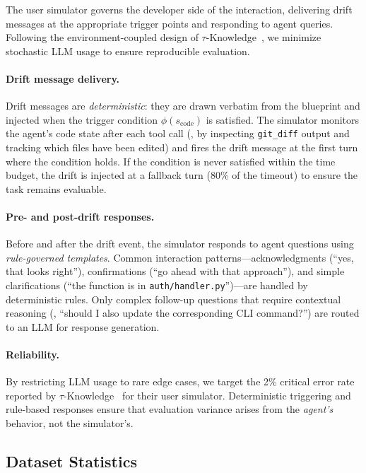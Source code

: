 The user simulator governs the developer side of the interaction, delivering drift messages at the appropriate trigger points and responding to agent queries. Following the environment-coupled design of $\tau$-Knowledge~\citep{tauknowledge2026}, we minimize stochastic LLM usage to ensure reproducible evaluation.

\paragraph{Drift message delivery.}
Drift messages are \emph{deterministic}: they are drawn verbatim from the blueprint and injected when the trigger condition $\phi(s_{\text{code}})$ is satisfied. The simulator monitors the agent's code state after each tool call (\eg, by inspecting \texttt{git\_diff} output and tracking which files have been edited) and fires the drift message at the first turn where the condition holds. If the condition is never satisfied within the time budget, the drift is injected at a fallback turn (80\% of the timeout) to ensure the task remains evaluable.

\paragraph{Pre- and post-drift responses.}
Before and after the drift event, the simulator responds to agent questions using \emph{rule-governed templates}. Common interaction patterns---acknowledgments (``yes, that looks right''), confirmations (``go ahead with that approach''), and simple clarifications (``the function is in \texttt{auth/handler.py}'')---are handled by deterministic rules. Only complex follow-up questions that require contextual reasoning (\eg, ``should I also update the corresponding CLI command?'') are routed to an LLM for response generation.

\paragraph{Reliability.}
By restricting LLM usage to rare edge cases, we target the 2\% critical error rate reported by $\tau$-Knowledge~\citep{tauknowledge2026} for their user simulator. Deterministic triggering and rule-based responses ensure that evaluation variance arises from the \emph{agent's} behavior, not the simulator's.

\subsection{Dataset Statistics}
\label{sec:bench-stats}

